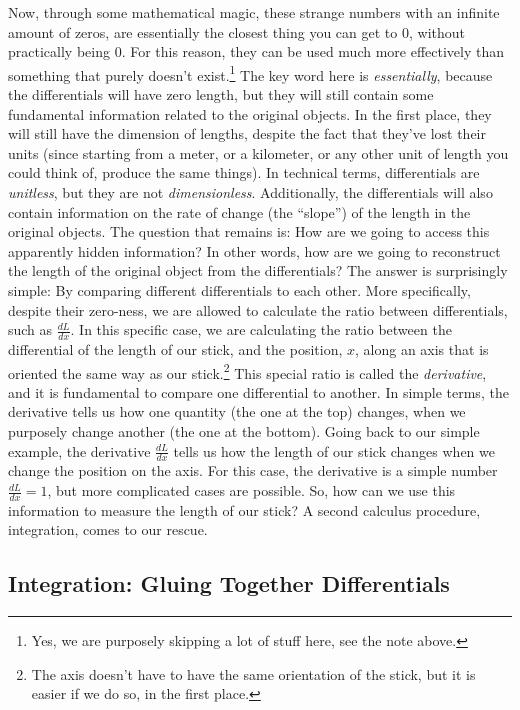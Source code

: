 \documentclass[
  9pt,
]{extbook}
\theoremstyle{definition}
\theoremstyle{definition}
\theoremstyle{definition}
\theoremstyle{definition}
\theoremstyle{remark}
\begin{document}
Now, through some mathematical magic, these strange numbers with an infinite amount of zeros, are essentially the closest thing you can get to \(0\), without practically being \(0\). For this reason, they can be used much more effectively than something that purely doesn't exist.\footnote{Yes, we are purposely skipping a lot of stuff here, see the note above.} The key word here is \emph{essentially}, because the differentials will have zero length, but they will still contain some fundamental information related to the original objects. In the first place, they will still have the dimension of lengths, despite the fact that they've lost their units (since starting from a meter, or a kilometer, or any other unit of length you could think of, produce the same things). In technical terms, differentials are \emph{unitless}, but they are not \emph{dimensionless}. Additionally, the differentials will also contain information on the rate of change (the ``slope'') of the length in the original objects. The question that remains is: How are we going to access this apparently hidden information? In other words, how are we going to reconstruct the length of the original object from the differentials? The answer is surprisingly simple: By comparing different differentials to each other. More specifically, despite their zero-ness, we are allowed to calculate the ratio between differentials, such as \(\frac{dL}{dx}\). In this specific case, we are calculating the ratio between the differential of the length of our stick, and the position, \(x\), along an axis that is oriented the same way as our stick.\footnote{The axis doesn't have to have the same orientation of the stick, but it is easier if we do so, in the first place.} This special ratio is called the \emph{derivative}, and it is fundamental to compare one differential to another. In simple terms, the derivative tells us how one quantity (the one at the top) changes, when we purposely change another (the one at the bottom). Going back to our simple example, the derivative \(\frac{dL}{dx}\) tells us how the length of our stick changes when we change the position on the axis. For this case, the derivative is a simple number \(\frac{dL}{dx}=1\), but more complicated cases are possible. So, how can we use this information to measure the length of our stick? A second calculus procedure, integration, comes to our rescue.

\subsection{Integration: Gluing Together Differentials}\label{integration-gluing-together-differentials}
\end{document}
